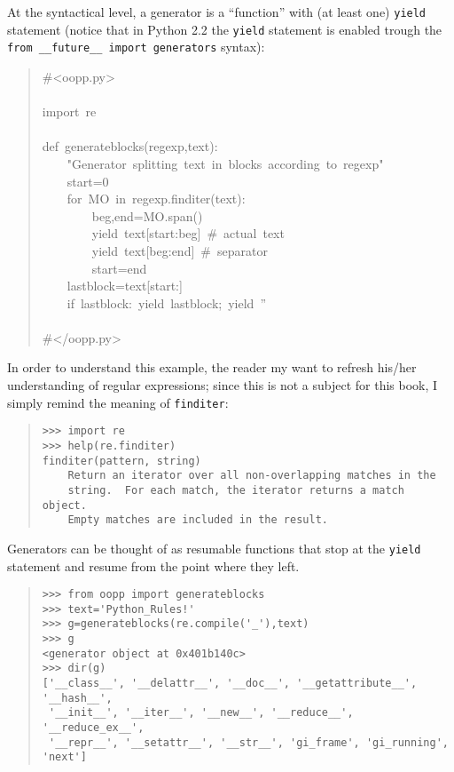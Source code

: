 \documentclass[10pt,english]{article}
\begin{document}
At the syntactical level, a generator is a ``function'' with (at least one) 
\texttt{yield} statement (notice that in Python 2.2 the \texttt{yield} statement is
enabled trough the \texttt{from {\_}{\_}future{\_}{\_} import generators} syntax):
\begin{quote}
\begin{ttfamily}\begin{flushleft}
\mbox{{\#}<oopp.py>}\\
\mbox{}\\
\mbox{import~re}\\
\mbox{}\\
\mbox{def~generateblocks(regexp,text):}\\
\mbox{~~~~"Generator~splitting~text~in~blocks~according~to~regexp"}\\
\mbox{~~~~start=0}\\
\mbox{~~~~for~MO~in~regexp.finditer(text):}\\
\mbox{~~~~~~~~beg,end=MO.span()}\\
\mbox{~~~~~~~~yield~text[start:beg]~{\#}~actual~text}\\
\mbox{~~~~~~~~yield~text[beg:end]~{\#}~separator}\\
\mbox{~~~~~~~~start=end}\\
\mbox{~~~~lastblock=text[start:]~}\\
\mbox{~~~~if~lastblock:~yield~lastblock;~yield~''}\\
\mbox{}\\
\mbox{{\#}</oopp.py>}
\end{flushleft}\end{ttfamily}
\end{quote}

In order to understand this example, the reader my want to refresh his/her 
understanding of regular expressions; since this is not a subject for 
this book, I simply remind the meaning of \texttt{finditer}:
\begin{quote}
\begin{verbatim}>>> import re
>>> help(re.finditer)
finditer(pattern, string)
    Return an iterator over all non-overlapping matches in the
    string.  For each match, the iterator returns a match object.
    Empty matches are included in the result.\end{verbatim}
\end{quote}

Generators can be thought of as resumable functions that stop at the
\texttt{yield} statement and resume from the point where they left.
\begin{quote}
\begin{verbatim}>>> from oopp import generateblocks
>>> text='Python_Rules!'
>>> g=generateblocks(re.compile('_'),text)
>>> g
<generator object at 0x401b140c>
>>> dir(g)
['__class__', '__delattr__', '__doc__', '__getattribute__', '__hash__', 
 '__init__', '__iter__', '__new__', '__reduce__', '__reduce_ex__', 
 '__repr__', '__setattr__', '__str__', 'gi_frame', 'gi_running', 'next']\end{verbatim}
\end{quote}
\end{document}
